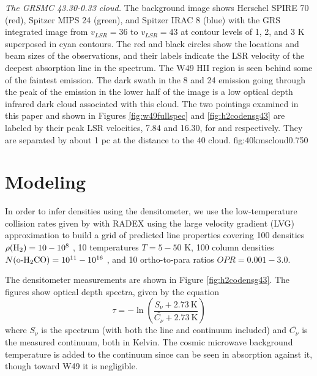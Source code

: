{\textit{The GRSMC 43.30-0.33 cloud.}  The background image shows Herschel SPIRE 70 \um (red),
Spitzer MIPS 24 \um (green), and Spitzer IRAC 8 \um (blue) with
the GRS \thirteenco \citep{Jackson2006a} integrated image from $v_{LSR}=36$ \kms to $v_{LSR}=43$ \kms at contour levels of
1, 2, and 3 K \kms superposed in cyan contours.  The red and black circles
show the locations and beam sizes of the \formaldehyde observations, and their labels indicate the LSR velocity
of the deepest absorption line in the spectrum.  The W49 HII region is seen
behind some of the faintest \thirteenco emission.  The dark swath in the 8 and
24 \um emission going through the peak of the \thirteenco emission in the lower
half of the image is a low optical depth infrared dark cloud associated with
this cloud.  The two pointings examined in this paper and shown in Figures
\ref{fig:w49fullspec} and \ref{fig:h2codensg43} are labeled by their peak LSR
velocities, 7.84 and 16.30, for \north and \south respectively.  They are separated by
about 1 pc at the distance to the 40 \kms cloud.}
{fig:40kmscloud}{0.75}{0}

\section{Modeling \formaldehyde}
\label{sec:modeling}
In order to infer densities using the \formaldehyde densitometer, we use the
low-temperature collision rates given by \citet{Troscompt2009a} with RADEX
using the large velocity gradient (LVG) approximation \citep{van-der-Tak2007a} to build a grid of
predicted line properties covering 100 densities $\rho(\textrm{H}_{2}) = 10-10^8$ \percc,
10 temperatures $T=5-50$ K, 100 column densities $N(\textrm{o-H}_2\textrm{CO}) = 10^{11}-10^{16}$
\persc, and 10 \hh ortho-to-para ratios $OPR = 0.001-3.0$.

The \formaldehyde densitometer measurements are shown in Figure \ref{fig:h2codensg43}.
The figures show optical depth spectra, given by the equation
\begin{equation}
    \tau = -\ln\left(\frac{S_\nu + 2.73\mathrm{~K}}{\bar{C_\nu} + 2.73\mathrm{~K}}\right)
\end{equation}
where $S_\nu$ is the spectrum (with both the line and continuum included) and $\bar{C_\nu}$ is
the measured continuum, both in Kelvin.  The cosmic microwave background
temperature is added to the continuum since \formaldehyde can be seen in
absorption against it, though toward W49 it is negligible.



